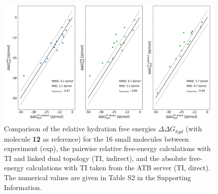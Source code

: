 \begin{figure}[h!]
    \centering
    \includegraphics[width=\textwidth]{fig/results/pairwise/FE/M030_graph_ddG_solv_correlation_ATB_TI.png}
    \caption{Comparison of the relative hydration free energies $\Delta \Delta G_{hyd}$ (with molecule \textbf{12} as reference) for the 16 small molecules between experiment (exp), the pairwise relative free-energy calculations with TI and linked dual topology (TI, indirect), and the absolute free-energy calculations with TI taken from the ATB server\cite{Stroet2018} (TI, direct). The numerical values are given in Table S2 in the Supporting Information.} 
    \label{fig: pairCorr}
\end{figure}


